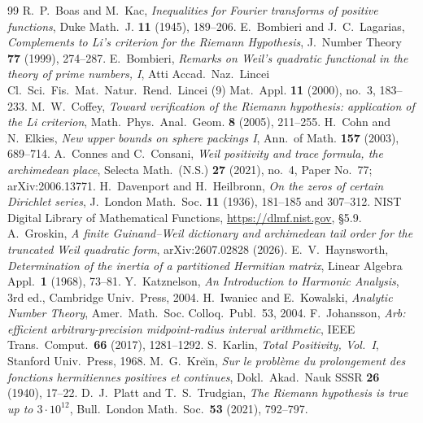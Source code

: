\documentclass[11pt]{amsart}
\theoremstyle{definition}
\theoremstyle{remark}
\begin{document}
\begin{thebibliography}{99}
 R.~P.~Boas and M.~Kac, \emph{Inequalities for Fourier transforms of positive
functions}, Duke Math.~J. \textbf{11} (1945), 189--206.
 E.~Bombieri and J.~C.~Lagarias, \emph{Complements to Li's criterion
for the Riemann Hypothesis}, J.~Number Theory \textbf{77} (1999), 274--287.
 E.~Bombieri, \emph{Remarks on Weil's quadratic functional in the theory of
prime numbers, I}, Atti Accad.~Naz.~Lincei Cl.~Sci.~Fis.~Mat.~Natur.~Rend.~Lincei (9) Mat.~Appl.
\textbf{11} (2000), no.~3, 183--233.
 M.~W.~Coffey, \emph{Toward verification of the Riemann hypothesis:
application of the Li criterion}, Math.~Phys.~Anal.~Geom. \textbf{8} (2005), 211--255.
 H.~Cohn and N.~Elkies, \emph{New upper bounds on sphere packings I},
Ann.~of Math. \textbf{157} (2003), 689--714.
 A.~Connes and C.~Consani, \emph{Weil positivity and trace formula, the archimedean place}, Selecta Math.\ (N.S.) \textbf{27} (2021), no.~4, Paper No.~77; arXiv:2006.13771.
 H.~Davenport and H.~Heilbronn, \emph{On the zeros of certain
Dirichlet series}, J.~London Math.~Soc. \textbf{11} (1936), 181--185 and 307--312.
 NIST Digital Library of Mathematical Functions, \url{https://dlmf.nist.gov}, \S5.9.
 A.~Groskin, \emph{A finite Guinand--Weil dictionary and archimedean tail
order for the truncated Weil quadratic form}, arXiv:2607.02828 (2026).
 E.~V.~Haynsworth, \emph{Determination of the inertia of a partitioned Hermitian
matrix}, Linear Algebra Appl.\ \textbf{1} (1968), 73--81.
 Y.~Katznelson, \emph{An Introduction to Harmonic Analysis}, 3rd ed.,
Cambridge Univ.~Press, 2004.
 H.~Iwaniec and E.~Kowalski, \emph{Analytic Number Theory}, Amer.~Math.~Soc.
Colloq.~Publ.~53, 2004.
 F.~Johansson, \emph{Arb: efficient arbitrary-precision midpoint-radius interval
arithmetic}, IEEE Trans.\ Comput.\ \textbf{66} (2017), 1281--1292.
 S.~Karlin, \emph{Total Positivity, Vol.~I}, Stanford Univ.~Press, 1968.
 M.~G.~Kre\u{\i}n, \emph{Sur le probl\`eme du prolongement des fonctions
hermitiennes positives et continues}, Dokl.~Akad.~Nauk SSSR \textbf{26} (1940), 17--22.
 D.~J.~Platt and T.~S.~Trudgian, \emph{The Riemann hypothesis is true up to
$3\cdot10^{12}$}, Bull.\ London Math.\ Soc.\ \textbf{53} (2021), 792--797.

\end{thebibliography}
\end{document}

